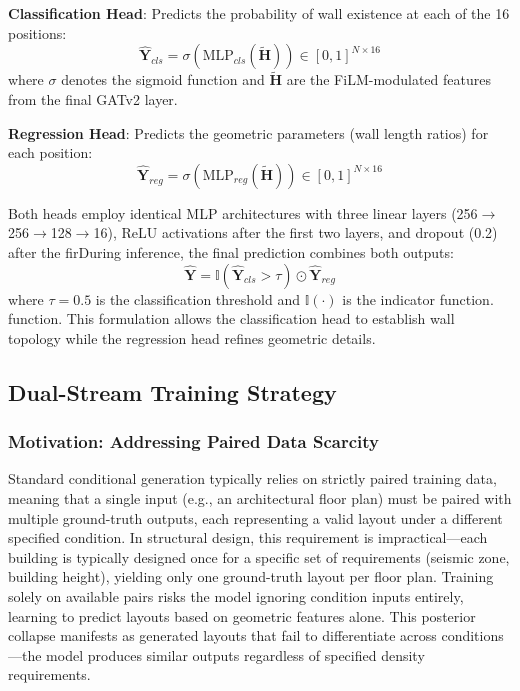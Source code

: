 \textbf{Classification Head}: Predicts the probability of wall existence at each of the 16 positions:
\begin{equation}
\hat{\mathbf{Y}}_{cls} = \sigma(\text{MLP}_{cls}(\tilde{\mathbf{H}})) \in [0,1]^{N \times 16}
\label{eq:method_cls_head}
\end{equation}
where $\sigma$ denotes the sigmoid function and $\tilde{\mathbf{H}}$ are the FiLM-modulated features from the final GATv2 layer.

\textbf{Regression Head}: Predicts the geometric parameters (wall length ratios) for each position:
\begin{equation}
\hat{\mathbf{Y}}_{reg} = \sigma(\text{MLP}_{reg}(\tilde{\mathbf{H}})) \in [0,1]^{N \times 16}
\label{eq:method_reg_head}
\end{equation}

Both heads employ identical MLP architectures with three linear layers (256$\to$256$\to$128$\to$16), ReLU activations after the first two layers, and dropout (0.2) after the firDuring inference, the final prediction combines both outputs:
\begin{equation}
\hat{\mathbf{Y}} = \mathbb{I}(\hat{\mathbf{Y}}_{cls} > \tau) \odot \hat{\mathbf{Y}}_{reg}
\label{eq:method_infer_comb}
\end{equation}
where $\tau = 0.5$ is the classification threshold and $\mathbb{I}(\cdot)$ is the indicator function.
 function.
This formulation allows the classification head to establish wall topology while the regression head refines geometric details.

\subsection{Dual-Stream Training Strategy}
\label{subsec:training_strategy}

\subsubsection{Motivation: Addressing Paired Data Scarcity}

Standard conditional generation typically relies on strictly paired training data, meaning that a single input (e.g., an architectural floor plan) must be paired with multiple ground-truth outputs, each representing a valid layout under a different specified condition.
In structural design, this requirement is impractical---each building is typically designed once for a specific set of requirements (seismic zone, building height), yielding only one ground-truth layout per floor plan.
Training solely on available pairs risks the model ignoring condition inputs entirely, learning to predict layouts based on geometric features alone.
This posterior collapse manifests as generated layouts that fail to differentiate across conditions---the model produces similar outputs regardless of specified density requirements.


